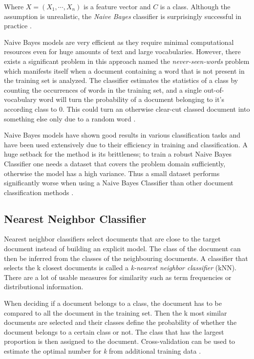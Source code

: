 Where $X = (X_{1},\cdots, X_{n})$ is a feature vector and $C$ is a class.
Although the assumption is unrealistic, the \textit{Naive Bayes} classifier is surprisingly successful in practice \cite{rish}.

Naive Bayes models are very efficient as they require minimal computational resources even for huge amounts of text and large vocabularies.
However, there exists a significant problem in this approach named the \textit{never-seen-words} problem which manifests itself when a document containing a word that is not present in the training set is analyzed.
The classifier estimates the statistics of a class by counting the occurrences of words in the training set, and a single out-of-vocabulary word will turn the probability of a document belonging to it's according class to 0.
This could turn an otherwise clear-cut classed document into something else only due to a random word \cite{rigutini2004}.

Naive Bayes models have shown good results in various classification tasks and have been used extensively due to their efficiency in training and classification.
A huge setback for the method is its brittleness; to train a robust Naive Bayes Classifier one needs a dataset that covers the problem domain sufficiently, otherwise the model has a high variance.
Thus a small dataset performs significantly worse when using a Naive Bayes Classifier than other document classification methods \cite{rigutini2004} \cite{lewis1998}.

\subsection{Nearest Neighbor Classifier} \label{Nearest Neighbor Classifier}
Nearest neighbor classifiers select documents that are close to the target document instead of building an explicit model.
The class of the document can then be inferred from the classes of the neighbouring documents.
A classifier that selects the k closest documents is called a \textit{k-nearest neighbor classifier} (kNN).
There are a lot of usable measures for similarity such as term frequencies or distributional information.

When deciding if a document belongs to a class, the document has to be compared to all the document in the training set.
Then the k most similar documents are selected and their classes define the probability of whether the document belongs to a certain class or not.
The class that has the largest proportion is then assigned to the document.
Cross-validation can be used to estimate the optimal number for \textit{k} from additional training data \cite{hotho}.

